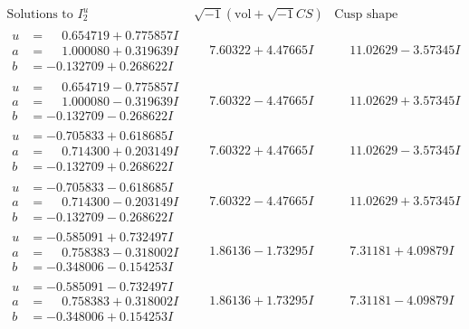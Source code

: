 \documentclass[1p]{elsarticle_modified}
\theoremstyle{definition}
\newcommand{\I}{\sqrt{-1}}
\begin{document}
$$\begin{array}{c|c|c}  
\text{Solutions to }I^u_{2}& \I (\text{vol} + \sqrt{-1}CS) & \text{Cusp shape}\\
 \hline 
\begin{aligned}
u &= \phantom{-}0.654719 + 0.775857 I \\
a &= \phantom{-}1.000080 + 0.319639 I \\
b &= -0.132709 + 0.268622 I\end{aligned}
 & \phantom{-}7.60322 + 4.47665 I & \phantom{-}11.02629 - 3.57345 I \\ \hline\begin{aligned}
u &= \phantom{-}0.654719 - 0.775857 I \\
a &= \phantom{-}1.000080 - 0.319639 I \\
b &= -0.132709 - 0.268622 I\end{aligned}
 & \phantom{-}7.60322 - 4.47665 I & \phantom{-}11.02629 + 3.57345 I \\ \hline\begin{aligned}
u &= -0.705833 + 0.618685 I \\
a &= \phantom{-}0.714300 + 0.203149 I \\
b &= -0.132709 + 0.268622 I\end{aligned}
 & \phantom{-}7.60322 + 4.47665 I & \phantom{-}11.02629 - 3.57345 I \\ \hline\begin{aligned}
u &= -0.705833 - 0.618685 I \\
a &= \phantom{-}0.714300 - 0.203149 I \\
b &= -0.132709 - 0.268622 I\end{aligned}
 & \phantom{-}7.60322 - 4.47665 I & \phantom{-}11.02629 + 3.57345 I \\ \hline\begin{aligned}
u &= -0.585091 + 0.732497 I \\
a &= \phantom{-}0.758383 - 0.318002 I \\
b &= -0.348006 - 0.154253 I\end{aligned}
 & \phantom{-}1.86136 - 1.73295 I & \phantom{-}7.31181 + 4.09879 I \\ \hline\begin{aligned}
u &= -0.585091 - 0.732497 I \\
a &= \phantom{-}0.758383 + 0.318002 I \\
b &= -0.348006 + 0.154253 I\end{aligned}
 & \phantom{-}1.86136 + 1.73295 I & \phantom{-}7.31181 - 4.09879 I \\ \hline\begin{aligned}

\end{aligned}
\end{array}$$
\end{document}

